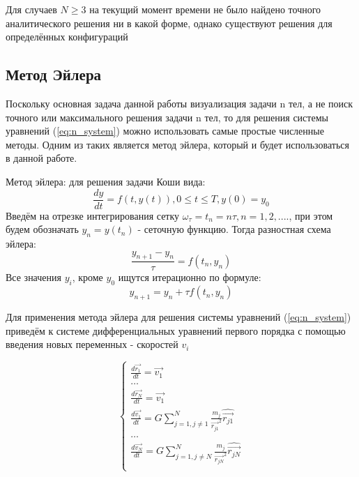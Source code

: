 Для случаев $N \geq 3$ на текущий момент времени не было найдено точного аналитического решения ни в какой форме, однако существуют решения для определённых конфигураций
\subsection{Метод Эйлера}
Поскольку основная задача данной работы визуализация задачи n тел, а не поиск точного или максимального решения задачи n тел, то для решения системы уравнений (\ref{eq:n_system}) можно использовать самые простые численные методы. Одним из таких является метод эйлера, который и будет использоваться в данной работе.

Метод эйлера: для решения задачи Коши вида:
\begin{equation}
	\label{eq:koshi}
	\frac{dy}{dt} = f(t, y(t)), 0 \leq t \leq T, y(0) = y_0
\end{equation}
Введём на отрезке интегрирования сетку $\omega_\tau = {t_n = n\tau, n = 1,2,....}$, при этом будем обозначать $y_n = y(t_n)$  - сеточную функцию.
Тогда разностная схема эйлера:
\begin{equation}
	\label{eq:euler_frac}
	\frac{y_{n+1} - y_n}{\tau} = f(t_n, y_n)
\end{equation}
Все значения $y_i$, кроме $y_0$ ищутся итерационно по формуле:
\begin{equation}
	\label{eq:euler_formula}
	y_{n+1} = y_n + \tau f(t_n, y_n)
\end{equation}

Для применения метода эйлера для решения системы уравнений (\ref{eq:n_system}) приведём к системе дифференциальных уравнений первого порядка с помощью введения новых переменных - скоростей $v_i$ 

\begin{equation}
	\label{n_system_velocities}
	\begin{cases}
		\frac{d\vec{r_1}}{dt} = \vec{v_1} \\
		\dots \\
		\frac{d\vec{r_N}}{dt} = \vec{v_1} \\
		
		\frac{d\vec{v_1}}{dt} = G\sum_{j=1, j \neq 1}^{N}{\frac{m_j}{\vec{r_{j1}}^2}\hat{\vec{r_{j1}}}} \\
		\dots \\
		\frac{d\vec{v_N}}{dt} = G\sum_{j=1, j \neq N}^{N}{\frac{m_j}{\vec{r_{jN}}^2}\hat{\vec{r_{jN}}}} \\
	\end{cases}
\end{equation}

